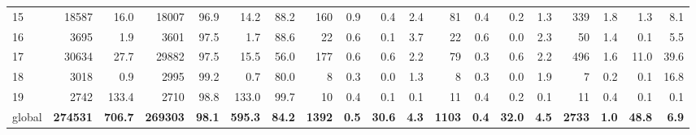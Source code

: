 \begin{tabular}{lrrrrrrrrrrrrrrrrrr}
15 & 18587 & 16.0 & 18007 & 96.9 & 14.2 & 88.2 & 160 & 0.9 & 0.4 & 2.4 & 81 & 0.4 & 0.2 & 1.3 & 339 & 1.8 & 1.3 & 8.1 \\
16 & 3695 & 1.9 & 3601 & 97.5 & 1.7 & 88.6 & 22 & 0.6 & 0.1 & 3.7 & 22 & 0.6 & 0.0 & 2.3 & 50 & 1.4 & 0.1 & 5.5 \\
17 & 30634 & 27.7 & 29882 & 97.5 & 15.5 & 56.0 & 177 & 0.6 & 0.6 & 2.2 & 79 & 0.3 & 0.6 & 2.2 & 496 & 1.6 & 11.0 & 39.6 \\
18 & 3018 & 0.9 & 2995 & 99.2 & 0.7 & 80.0 & 8 & 0.3 & 0.0 & 1.3 & 8 & 0.3 & 0.0 & 1.9 & 7 & 0.2 & 0.1 & 16.8 \\
19 & 2742 & 133.4 & 2710 & 98.8 & 133.0 & 99.7 & 10 & 0.4 & 0.1 & 0.1 & 11 & 0.4 & 0.2 & 0.1 & 11 & 0.4 & 0.1 & 0.1 \\
global & \textbf{274531} & \textbf{706.7} & \textbf{269303} & \textbf{98.1} & \textbf{595.3} & \textbf{84.2} & \textbf{1392} & \textbf{0.5} & \textbf{30.6} & \textbf{4.3} & \textbf{1103} & \textbf{0.4} & \textbf{32.0} & \textbf{4.5} & \textbf{2733} & \textbf{1.0} & \textbf{48.8} & \textbf{6.9} \\
\end{tabular}

